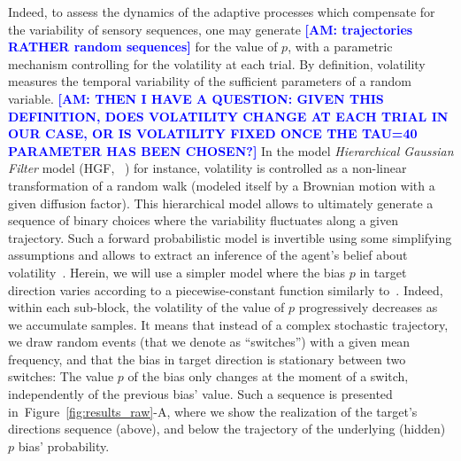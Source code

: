 \documentclass[12pt,english]{article}%
\newcommand{\citep}[1]{\parencite{#1}}
\newcommand{\citet}[1]{\textcite{#1}}
\newcommand{\seeFig}[1]{Figure~\ref{fig:#1}}
\newcommand{\AM}[1]{\textbf{\textcolor{blue}{[AM: #1]}}}
\begin{document}
Indeed, to assess the dynamics of the adaptive processes
which compensate for the variability of sensory sequences,
one may generate \AM{trajectories RATHER random sequences} for the value of $p$,
with a parametric mechanism controlling for the volatility at each trial.
By definition, volatility measures the temporal variability
of the sufficient parameters of a random variable. \AM{THEN I HAVE A QUESTION: GIVEN THIS DEFINITION, DOES VOLATILITY CHANGE AT EACH TRIAL IN OUR CASE, OR IS VOLATILITY FIXED ONCE THE TAU=40 PARAMETER HAS BEEN CHOSEN?}
In the  model \emph{Hierarchical Gaussian Filter} model (HGF, ~\citet{Mathys11}) for instance,
volatility is controlled as a non-linear transformation
of a random walk (modeled itself by a Brownian motion with a given diffusion factor).
This hierarchical model allows to ultimately generate a sequence of binary choices
where the variability fluctuates along a given trajectory.
Such a forward probabilistic model is invertible
using some simplifying assumptions and allows
to extract an inference of the agent's belief about volatility~\citep{Vossel14}.
Herein, we will use a simpler model where
the bias $p$ in target direction varies according to a piecewise-constant function
similarly to~\citet{Meyniel13}.
Indeed, within each sub-block, the volatility of the value of $p$
progressively decreases as we accumulate samples.
It means that instead of a complex stochastic trajectory,
we draw random events (that we denote as ``switches'')
with a given mean frequency,
and that the bias in target direction is stationary between two switches:
The value $p$ of the bias only changes at the moment of a switch,
independently of the previous bias' value.
Such a sequence is presented in~\seeFig{results_raw}-A, %
where we show the realization of the target's directions sequence (above), and
below the trajectory of the underlying (hidden) $p$ bias' probability.
\end{document}
